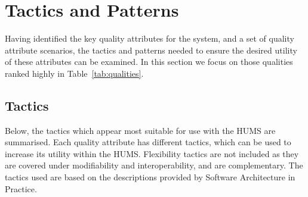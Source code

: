 \documentclass[10pt,a4paper]{article}
\begin{document}
\section{Tactics and Patterns}
\label{sec:tactics}
Having identified the key quality attributes for the system, and a set of quality attribute scenarios, the tactics and patterns needed to ensure the desired utility of these attributes can be examined. In this section we focus on those qualities ranked highly in Table~\ref{tab:qualities}.

\subsection{Tactics}

Below, the tactics which appear most suitable for use with the HUMS are summarised. Each quality attribute has different tactics, which can be used to increase its utility within the HUMS. Flexibility tactics are not included as they are covered under modifiability and interoperability, and are complementary. The tactics used are based on the descriptions provided by Software Architecture in Practice\cite{Bass98}.
\end{document}
